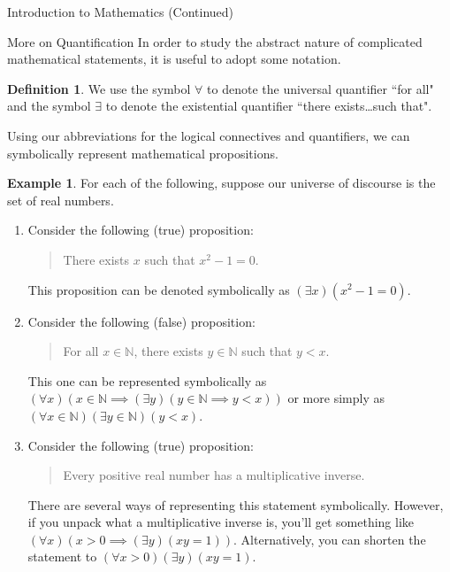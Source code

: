 \documentclass[11pt]{article}
\theoremstyle{definition}
\newtheorem{definition}[theorem]{Definition}
\newtheorem{example}[theorem]{Example}
\begin{document}
\begin{section}{Introduction to Mathematics (Continued)}
\begin{subsection}{More on Quantification}
In order to study the abstract nature of complicated mathematical statements, it is useful to adopt some notation.

\begin{definition}
We use the symbol $\forall$ to denote the universal quantifier ``for all" and the symbol $\exists$ to denote the existential quantifier ``there exists\ldots such that".
\end{definition}

Using our abbreviations for the logical connectives and quantifiers, we can symbolically represent mathematical propositions.

\begin{example}
For each of the following, suppose our universe of discourse is the set of real numbers.
\begin{enumerate}

\item Consider the following (true) proposition:

\begin{quote}
There exists $x$ such that $x^2-1=0$.
\end{quote}

This proposition can be denoted symbolically as $(\exists x)(x^2-1=0)$.

\item Consider the following (false) proposition:

\begin{quote}
For all $x\in \mathbb{N}$, there exists $y\in\mathbb{N}$ such that $y<x$.
\end{quote}

This one can be represented symbolically as $(\forall x)(x\in\mathbb{N}\implies (\exists y)(y\in\mathbb{N}\implies y<x))$ or more simply as $(\forall x\in\mathbb{N})(\exists y\in\mathbb{N})(y<x)$.

\item Consider the following (true) proposition:

\begin{quote}
Every positive real number has a multiplicative inverse.
\end{quote}

There are several ways of representing this statement symbolically.  However, if you unpack what a multiplicative inverse is, you'll get something like $(\forall x)(x>0 \implies (\exists y)(xy=1))$.  Alternatively, you can shorten the statement to $(\forall x>0)(\exists y)(xy=1)$.

\end{enumerate}
\end{example}


\end{subsection}
\end{section}
\end{document}
